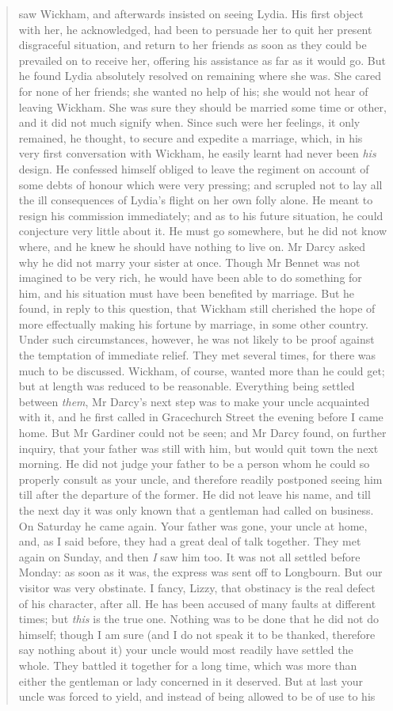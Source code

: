 \begin{quotation}
saw Wickham, and afterwards insisted on seeing Lydia. His first object with her, he acknowledged, had been to persuade her to quit her present disgraceful situation, and return to her friends as soon as they could be prevailed on to receive her, offering his assistance as far as it would go. But he found Lydia absolutely resolved on remaining where she was. She cared for none of her friends; she wanted no help of his; she would not hear of leaving Wickham. She was sure they should be married some time or other, and it did not much signify when. Since such were her feelings, it only remained, he thought, to secure and expedite a marriage, which, in his very first conversation with Wickham, he easily learnt had never been \textit{his} design. He confessed himself obliged to leave the regiment on account of some debts of honour which were very pressing; and scrupled not to lay all the ill consequences of Lydia's flight on her own folly alone. He meant to resign his commission immediately; and as to his future situation, he could conjecture very little about it. He must go somewhere, but he did not know where, and he knew he should have nothing to live on. Mr Darcy asked why he did not marry your sister at once. Though Mr Bennet was not imagined to be very rich, he would have been able to do something for him, and his situation must have been benefited by marriage. But he found, in reply to this question, that Wickham still cherished the hope of more effectually making his fortune by marriage, in some other country. Under such circumstances, however, he was not likely to be proof against the temptation of immediate relief. They met several times, for there was much to be discussed. Wickham, of course, wanted more than he could get; but at length was reduced to be reasonable. Everything being settled between \textit{them}, Mr Darcy's next step was to make your uncle acquainted with it, and he first called in Gracechurch Street the evening before I came home. But Mr Gardiner could not be seen; and Mr Darcy found, on further inquiry, that your father was still with him, but would quit town the next morning. He did not judge your father to be a person whom he could so properly consult as your uncle, and therefore readily postponed seeing him till after the departure of the former. He did not leave his name, and till the next day it was only known that a gentleman had called on business. On Saturday he came again. Your father was gone, your uncle at home, and, as I said before, they had a great deal of talk together. They met again on Sunday, and then \textit{I} saw him too. It was not all settled before Monday: as soon as it was, the express was sent off to Longbourn. But our visitor was very obstinate. I fancy, Lizzy, that obstinacy is the real defect of his character, after all. He has been accused of many faults at different times; but \textit{this} is the true one. Nothing was to be done that he did not do himself; though I am sure (and I do not speak it to be thanked, therefore say nothing about it) your uncle would most readily have settled the whole. They battled it together for a long time, which was more than either the gentleman or lady concerned in it deserved. But at last your uncle was forced to yield, and instead of being allowed to be of use to his 
\end{quotation}
